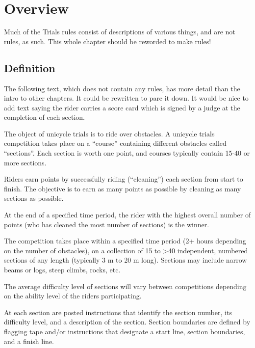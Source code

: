 \chapter{Overview}

\begin{comment2016}
Much of the Trials rules consist of descriptions of various things, and are not rules, as such.
This whole chapter should be reworded to make rules!
\end{comment2016}

\section{Definition}

\begin{comment2016}
The following text, which does not contain any rules, has more detail than the intro to other chapters.
It could be rewritten to pare it down.
It would be nice to add text saying the rider carries a score card which is signed by a judge at the completion of each section.
\end{comment2016}

The object of unicycle trials is to ride over obstacles.
A unicycle trials competition takes place on a ``course'' containing different obstacles called ``sections''.
Each section is worth one point, and courses typically contain 15-40 or more sections.

Riders earn points by successfully riding (``cleaning'') each section from start to finish.
The objective is to earn as many points as possible by cleaning as many sections as possible.

At the end of a specified time period, the rider with the highest overall number of points (who has cleaned the most number of sections) is the winner.

The competition takes place within a specified time period (2+ hours depending on the number of obstacles), on a collection of 15 to >40 independent, numbered sections of any length (typically 3 m to 20 m long).
Sections may include narrow beams or logs, steep climbs, rocks, etc.

The average difficulty level of sections will vary between competitions depending on the ability level of the riders participating.

At each section are posted instructions that identify the section number, its difficulty level, and a description of the section.
Section boundaries are defined by flagging tape and/or instructions that designate a start line, section boundaries, and a finish line.

